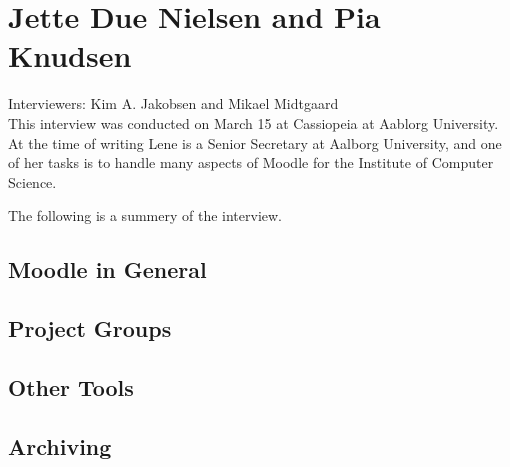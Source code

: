\section{Jette Due Nielsen and Pia Knudsen}
\label{sec:jettePia}
Interviewers: Kim A. Jakobsen and Mikael Midtgaard\\


This interview was conducted on March 15\ths{} at Cassiopeia at Aablorg University.
At the time of writing Lene is a Senior Secretary at Aalborg University, and one of her tasks is to handle many aspects of Moodle for the Institute of Computer Science.

The following is a summery of the interview.

\subsection*{Moodle in General}


\subsection*{Project Groups}


\subsection*{Other Tools}



\subsection*{Archiving}
